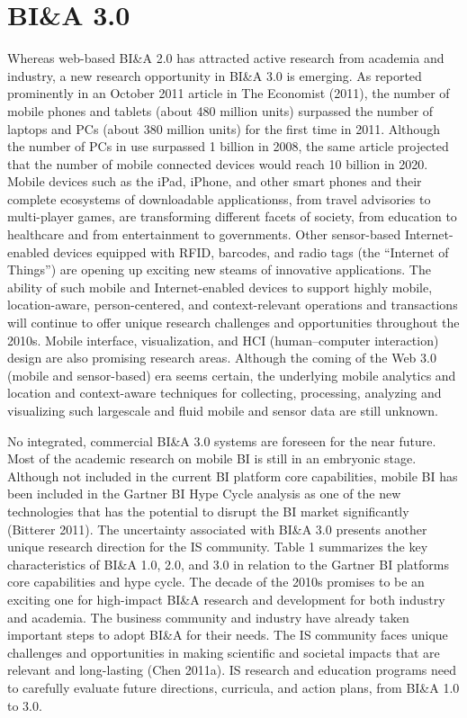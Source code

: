 \section{BI\&A 3.0}

Whereas web-based BI\&A 2.0 has attracted active research
from academia and industry, a new research opportunity in
BI\&A 3.0 is emerging. As reported prominently in an
October 2011 article in The Economist (2011), the number of
mobile phones and tablets (about 480 million units) surpassed
the number of laptops and PCs (about 380 million units) for
the first time in 2011. Although the number of PCs in use
surpassed 1 billion in 2008, the same article projected that the
number of mobile connected devices would reach 10 billion
in 2020. Mobile devices such as the iPad, iPhone, and other
smart phones and their complete ecosystems of downloadable
applicationss, from travel advisories to multi-player games,
are transforming different facets of society, from education to
healthcare and from entertainment to governments. Other
sensor-based Internet-enabled devices equipped with RFID,
barcodes, and radio tags (the “Internet of Things”) are
opening up exciting new steams of innovative applications.
The ability of such mobile and Internet-enabled devices to
support highly mobile, location-aware, person-centered, and
context-relevant operations and transactions will continue to
offer unique research challenges and opportunities throughout
the 2010s. Mobile interface, visualization, and HCI
(human–computer interaction) design are also promising
research areas. Although the coming of the Web 3.0 (mobile
and sensor-based) era seems certain, the underlying mobile
analytics and location and context-aware techniques for
collecting, processing, analyzing and visualizing such largescale
and fluid mobile and sensor data are still unknown.

No integrated, commercial BI\&A 3.0 systems are foreseen for
the near future. Most of the academic research on mobile BI
is still in an embryonic stage. Although not included in the
current BI platform core capabilities, mobile BI has been
included in the Gartner BI Hype Cycle analysis as one of the
new technologies that has the potential to disrupt the BI
market significantly (Bitterer 2011). The uncertainty associated
with BI\&A 3.0 presents another unique research
direction for the IS community.
Table 1 summarizes the key characteristics of BI\&A 1.0, 2.0,
and 3.0 in relation to the Gartner BI platforms core capabilities
and hype cycle.
The decade of the 2010s promises to be an exciting one for
high-impact BI\&A research and development for both industry
and academia. The business community and industry have
already taken important steps to adopt BI\&A for their needs.
The IS community faces unique challenges and opportunities
in making scientific and societal impacts that are relevant and
long-lasting (Chen 2011a). IS research and education programs
need to carefully evaluate future directions, curricula,
and action plans, from BI\&A 1.0 to 3.0.